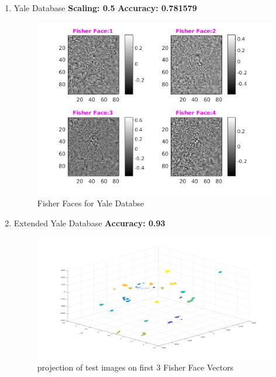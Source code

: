 \documentclass[a4paper,10pt]{report}
\begin{document}
\begin{enumerate}
 \item Yale Database 
 \newline
 \textbf{Scaling: 0.5}
  \newline
 \textbf{Accuracy: 0.781579 }\\
  \begin{figure}[h]
	\centering
	\includegraphics[scale=.6]{yaleScaleHalf.png}
	\caption{Fisher Faces for Yale Databse}
	\label{fig.e}
\end{figure}

\newpage

  \item Extended Yale Database
  \newline
   \textbf{Accuracy: 0.93 }\\
  \begin{figure}[h]
	\centering
	\includegraphics[scale=.35]{extendedYale.png}
	\caption{projection of test images on first 3 Fisher Face Vectors }
	\label{fig.f}
\end{figure}
\end{enumerate}
\end{document}
